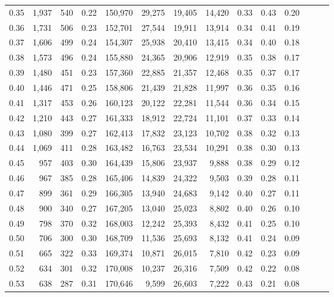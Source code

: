 \begin{tabular}{rrrrrrrrrrrrrr}
0.35 &  1,937 &  540 &  0.22 &  150,970 &   29,275 &  19,405 &  14,420 &  0.33 &  0.43 &      0.20 \\
0.36 &  1,731 &  506 &  0.23 &  152,701 &   27,544 &  19,911 &  13,914 &  0.34 &  0.41 &      0.19 \\
0.37 &  1,606 &  499 &  0.24 &  154,307 &   25,938 &  20,410 &  13,415 &  0.34 &  0.40 &      0.18 \\
0.38 &  1,573 &  496 &  0.24 &  155,880 &   24,365 &  20,906 &  12,919 &  0.35 &  0.38 &      0.17 \\
0.39 &  1,480 &  451 &  0.23 &  157,360 &   22,885 &  21,357 &  12,468 &  0.35 &  0.37 &      0.17 \\
0.40 &  1,446 &  471 &  0.25 &  158,806 &   21,439 &  21,828 &  11,997 &  0.36 &  0.35 &      0.16 \\
0.41 &  1,317 &  453 &  0.26 &  160,123 &   20,122 &  22,281 &  11,544 &  0.36 &  0.34 &      0.15 \\
0.42 &  1,210 &  443 &  0.27 &  161,333 &   18,912 &  22,724 &  11,101 &  0.37 &  0.33 &      0.14 \\
0.43 &  1,080 &  399 &  0.27 &  162,413 &   17,832 &  23,123 &  10,702 &  0.38 &  0.32 &      0.13 \\
0.44 &  1,069 &  411 &  0.28 &  163,482 &   16,763 &  23,534 &  10,291 &  0.38 &  0.30 &      0.13 \\
0.45 &    957 &  403 &  0.30 &  164,439 &   15,806 &  23,937 &   9,888 &  0.38 &  0.29 &      0.12 \\
0.46 &    967 &  385 &  0.28 &  165,406 &   14,839 &  24,322 &   9,503 &  0.39 &  0.28 &      0.11 \\
0.47 &    899 &  361 &  0.29 &  166,305 &   13,940 &  24,683 &   9,142 &  0.40 &  0.27 &      0.11 \\
0.48 &    900 &  340 &  0.27 &  167,205 &   13,040 &  25,023 &   8,802 &  0.40 &  0.26 &      0.10 \\
0.49 &    798 &  370 &  0.32 &  168,003 &   12,242 &  25,393 &   8,432 &  0.41 &  0.25 &      0.10 \\
0.50 &    706 &  300 &  0.30 &  168,709 &   11,536 &  25,693 &   8,132 &  0.41 &  0.24 &      0.09 \\
0.51 &    665 &  322 &  0.33 &  169,374 &   10,871 &  26,015 &   7,810 &  0.42 &  0.23 &      0.09 \\
0.52 &    634 &  301 &  0.32 &  170,008 &   10,237 &  26,316 &   7,509 &  0.42 &  0.22 &      0.08 \\
0.53 &    638 &  287 &  0.31 &  170,646 &    9,599 &  26,603 &   7,222 &  0.43 &  0.21 &      0.08 \\

\end{tabular}
